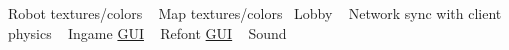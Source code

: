 
\begin{DoxyRefList}
\item[\label{todo__todo000001}%
\hypertarget{todo__todo000001}{}%
page \hyperlink{index}{package templates} ]Robot textures/colors ~\newline
 Map textures/colors~\newline
 Lobby ~\newline
 Network sync with client physics ~\newline
 Ingame \hyperlink{namespace_g_u_i}{G\+U\+I} ~\newline
 Refont \hyperlink{namespace_g_u_i}{G\+U\+I} ~\newline
 Sound ~\newline
 
\end{DoxyRefList}